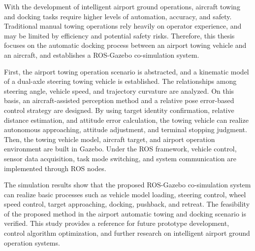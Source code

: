 \begin{abstracten}

With the development of intelligent airport ground operations, aircraft towing and docking tasks require higher levels of automation, accuracy, and safety. Traditional manual towing operations rely heavily on operator experience, and may be limited by efficiency and potential safety risks. Therefore, this thesis focuses on the automatic docking process between an airport towing vehicle and an aircraft, and establishes a ROS-Gazebo co-simulation system.

First, the airport towing operation scenario is abstracted, and a kinematic model of a dual-axle steering towing vehicle is established. The relationships among steering angle, vehicle speed, and trajectory curvature are analyzed. On this basis, an aircraft-assisted perception method and a relative pose error-based control strategy are designed. By using target identity confirmation, relative distance estimation, and attitude error calculation, the towing vehicle can realize autonomous approaching, attitude adjustment, and terminal stopping judgment. Then, the towing vehicle model, aircraft target, and airport operation environment are built in Gazebo. Under the ROS framework, vehicle control, sensor data acquisition, task mode switching, and system communication are implemented through ROS nodes.

The simulation results show that the proposed ROS-Gazebo co-simulation system can realize basic processes such as vehicle model loading, steering control, wheel speed control, target approaching, docking, pushback, and retreat. The feasibility of the proposed method in the airport automatic towing and docking scenario is verified. This study provides a reference for future prototype development, control algorithm optimization, and further research on intelligent airport ground operation systems.

\end{abstracten}
